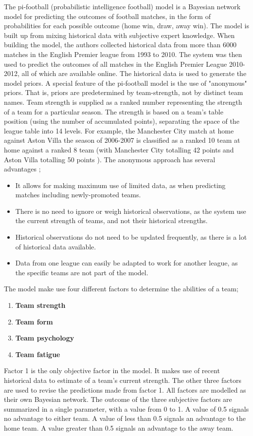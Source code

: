 The pi-football (probabilistic intelligence football) model \citep{bib:constantinou-fenton-neil-2012} is a Bayesian network model for predicting the outcomes of football matches, in the form of probabilities for each possible outcome (home win, draw, away win). The model is built up from mixing historical data with subjective expert knowledge. When building the model, the authors collected historical data from more than 6000 matches in the English Premier league from 1993 to 2010. The system was then used to predict the outcomes of all matches in the English Premier League 2010-2012, all of which are available online. The historical data is used to generate the model priors. A special feature of the pi-football model is the use of "anonymous" priors. That is, priors are predetermined by team-strength, not by distinct team names. Team strength is supplied as a ranked number representing the strength of a team for a particular season. The strength is based on a team's table position (using the number of accumulated points), separating the space of the league table into 14 levels. For example, the Manchester City match at home against Aston Villa the season of 2006-2007 is classified as a ranked 10 team at home against a ranked 8 team (with Manchester City totalling 42 points and Aston Villa totalling 50 points \citep{bib:constantinou-fenton-neil-2012}). The anonymous approach has several advantages \citep{bib:constantinou-fenton-neil-2012};
\begin{itemize}
    \item It allows for making maximum use of limited data, as when predicting matches including newly-promoted teams.
    \item There is no need to ignore or weigh historical observations, as the system use the current strength of teams, and not their historical strengths.
    \item Historical observations do not need to be updated frequently, as there is a lot of historical data available.
    \item Data from one league can easily be adapted to work for another league, as the specific teams are not part of the model.
\end{itemize}

The model make use four different factors to determine the abilities of a team;
\begin{enumerate}
    \item \textbf{Team strength}
    \item \textbf{Team form}
    \item \textbf{Team psychology}
    \item \textbf{Team fatigue}
\end{enumerate}
Factor 1 is the only objective factor in the model. It makes use of recent historical data to estimate of a team's current strength. The other three factors are used to revise the predictions made from factor 1. All factors are modelled as their own Bayesian network. The outcome of the three subjective factors are summarized in a single parameter, with a value from 0 to 1. A value of 0.5 signals no advantage to either team. A value of less than 0.5 signals an advantage to the home team. A value greater than 0.5 signals an advantage to the away team.

